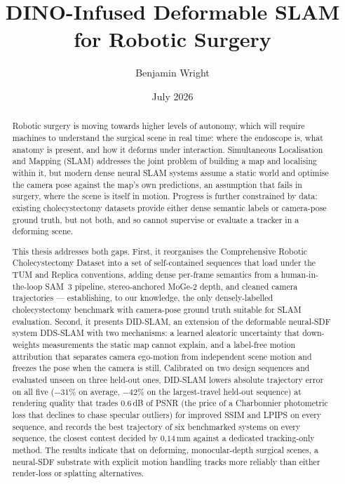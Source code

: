 \documentclass{article}
\title{DINO-Infused Deformable SLAM for Robotic Surgery}
\author{Benjamin Wright}
\date{July 2026}
\begin{document}
\maketitle
\begin{abstract}
Robotic surgery is moving towards higher levels of autonomy, which will require machines to understand the surgical scene in real time: where the endoscope is, what anatomy is present, and how it deforms under interaction. Simultaneous Localisation and Mapping (SLAM) addresses the joint problem of building a map and localising within it, but modern dense neural SLAM systems assume a static world and optimise the camera pose against the map's own predictions, an assumption that fails in surgery, where the scene is itself in motion. Progress is further constrained by data: existing cholecystectomy datasets provide either dense semantic labels or camera-pose ground truth, but not both, and so cannot supervise or evaluate a tracker in a deforming scene.

This thesis addresses both gaps. First, it reorganises the Comprehensive Robotic Cholecystectomy Dataset into a set of self-contained sequences that load under the TUM and Replica conventions, adding dense per-frame semantics from a human-in-the-loop SAM~3 pipeline, stereo-anchored MoGe-2 depth, and cleaned camera trajectories --- establishing, to our knowledge, the only densely-labelled cholecystectomy benchmark with camera-pose ground truth suitable for SLAM evaluation. Second, it presents DID-SLAM, an extension of the deformable neural-SDF system DDS-SLAM with two mechanisms: a learned aleatoric uncertainty that down-weights measurements the static map cannot explain, and a label-free motion attribution that separates camera ego-motion from independent scene motion and freezes the pose when the camera is still. Calibrated on two design sequences and evaluated unseen on three held-out ones, DID-SLAM lowers absolute trajectory error on all five ($-31\%$ on average, $-42\%$ on the largest-travel held-out sequence) at rendering quality that trades $0.6$\,dB of PSNR (the price of a Charbonnier photometric loss that declines to chase specular outliers) for improved SSIM and LPIPS on every sequence, and records the best trajectory of six benchmarked systems on every sequence, the closest contest decided by $0.14$\,mm against a dedicated tracking-only method. The results indicate that on deforming, monocular-depth surgical scenes, a neural-SDF substrate with explicit motion handling tracks more reliably than either render-loss or splatting alternatives.
\end{abstract}
\end{document}
